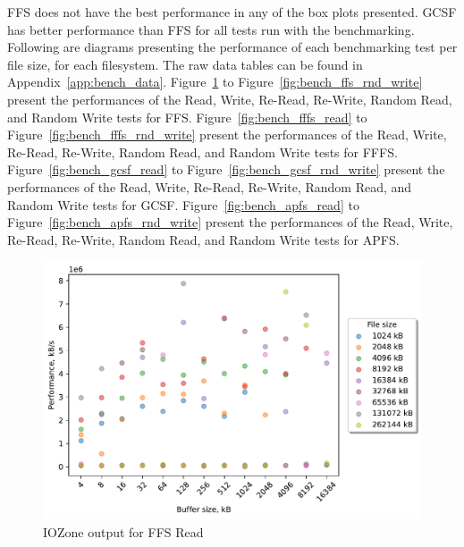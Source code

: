 \FloatBarrier

\gls{FFS} does not have the best performance in any of the box plots presented. \gls{GCSF} has better performance than \gls{FFS} for all tests run with the benchmarking. Following are diagrams presenting the performance of each benchmarking test per file size, for each filesystem. The raw data tables can be found in Appendix~\ref{app:bench_data}. Figure~\ref{fig:bench_ffs_read} to Figure~\ref{fig:bench_ffs_rnd_write} present the performances of the Read, Write, \mbox{Re-Read}, \mbox{Re-Write}, Random Read, and Random Write tests for \gls{FFS}. Figure~\ref{fig:bench_fffs_read} to Figure~\ref{fig:bench_fffs_rnd_write} present the performances of the Read, Write, \mbox{Re-Read}, \mbox{Re-Write}, Random Read, and Random Write tests for \gls{FFFS}.  Figure~\ref{fig:bench_gcsf_read} to Figure~\ref{fig:bench_gcsf_rnd_write} present the performances of the Read, Write, \mbox{Re-Read}, \mbox{Re-Write}, Random Read, and Random Write tests for \gls{GCSF}. Figure~\ref{fig:bench_apfs_read} to Figure~\ref{fig:bench_apfs_rnd_write} present the performances of the Read, Write, \mbox{Re-Read}, \mbox{Re-Write}, Random Read, and Random Write tests for \gls{APFS}.

\begin{figure}[!htb]
	\label{fig:bench_ffs_read}
	\begin{center}
		\includegraphics[width=1.0\textwidth]{figures.nosync/benchmarking/ffs/Read.pdf}
	\end{center}
	\caption{IOZone output for FFS Read}
\end{figure}

